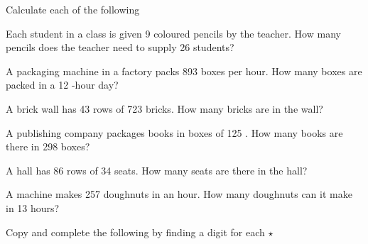 \begin{exercises}
\begin{questions}
        \Question[] Calculate each of the following
        \begin{parts}
            \Part[1] Each student in a class is given 9 coloured pencils by the teacher. How many pencils does the teacher need to supply 26 students?
            \begin{solutionordottedlines}[1in]
            \end{solutionordottedlines}
            \Part[1] A packaging machine in a factory packs 893 boxes per hour. How many boxes are packed in a 12 -hour day?
            \begin{solutionordottedlines}[1in]
            \end{solutionordottedlines}
            \Part[1] A brick wall has 43 rows of 723 bricks. How many bricks are in the wall?
            \begin{solutionordottedlines}[1in]
            \end{solutionordottedlines}
            \Part[1] A publishing company packages books in boxes of 125 . How many books are there in 298 boxes?
            \begin{solutionordottedlines}[1in]
            \end{solutionordottedlines}
        \end{parts}
        \Question[2] A hall has 86 rows of 34 seats. How many seats are there in the hall?
            \begin{solutionordottedlines}[1in]
            \end{solutionordottedlines}
        \Question[2] A machine makes 257 doughnuts in an hour. How many doughnuts can it make in 13 hours?
            \begin{solutionordottedlines}[1in]
            \end{solutionordottedlines}
        \Question[6] Copy and complete the following by finding a digit for each \(\star\)
        \begin{parts}\begin{multicols}{3}

\end{multicols}
\end{parts}
\end{questions}
\end{exercises}
